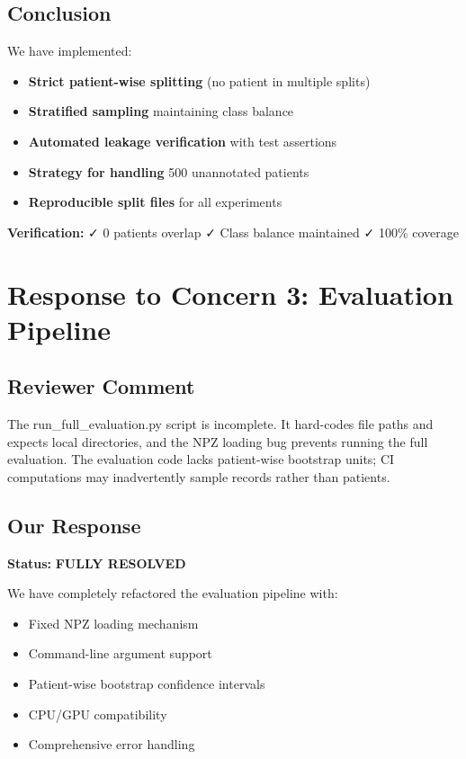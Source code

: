 \documentclass[11pt]{article}
\begin{document}
\subsection{Conclusion}

We have implemented:
\begin{itemize}
    \item \textbf{Strict patient-wise splitting} (no patient in multiple splits)
    \item \textbf{Stratified sampling} maintaining class balance
    \item \textbf{Automated leakage verification} with test assertions
    \item \textbf{Strategy for handling} 500 unannotated patients
    \item \textbf{Reproducible split files} for all experiments
\end{itemize}

\textbf{Verification:} ✓ 0 patients overlap ✓ Class balance maintained ✓ 100\% coverage

\newpage
\section{Response to Concern 3: Evaluation Pipeline}

\subsection{Reviewer Comment}
\begin{tcolorbox}[colback=red!5!white,colframe=red!75!black,title=Reviewer Concern]
The run\_full\_evaluation.py script is incomplete. It hard-codes file paths and expects local directories, and the NPZ loading bug prevents running the full evaluation. The evaluation code lacks patient-wise bootstrap units; CI computations may inadvertently sample records rather than patients.
\end{tcolorbox}

\subsection{Our Response}

\textbf{Status:} \textcolor{green!70!black}{\textbf{FULLY RESOLVED}}

We have completely refactored the evaluation pipeline with:
\begin{itemize}
    \item Fixed NPZ loading mechanism
    \item Command-line argument support
    \item Patient-wise bootstrap confidence intervals
    \item CPU/GPU compatibility
    \item Comprehensive error handling
\end{itemize}
\end{document}
